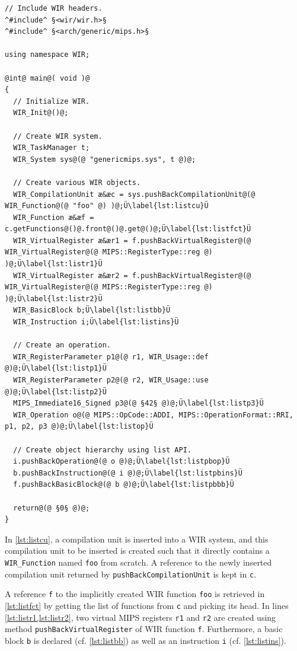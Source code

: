 \begin{lstlisting}[style=code,float=ht,caption={Construction of Object Hierarchies using List Interface},label=lst:listconstruction]
// Include WIR headers.
^#include^ §<wir/wir.h>§
^#include^ §<arch/generic/mips.h>§

using namespace WIR;

@int@ main@( void )@
{
  // Initialize WIR.
  WIR_Init@()@;

  // Create WIR system.
  WIR_TaskManager t;
  WIR_System sys@(@ "genericmips.sys", t @)@;

  // Create various WIR objects.
  WIR_CompilationUnit æ&æc = sys.pushBackCompilationUnit@(@ WIR_Function@(@ "foo" @) )@;Ü\label{lst:listcu}Ü
  WIR_Function æ&æf = c.getFunctions@()@.front@()@.get@()@;Ü\label{lst:listfct}Ü
  WIR_VirtualRegister æ&ær1 = f.pushBackVirtualRegister@(@ WIR_VirtualRegister@(@ MIPS::RegisterType::reg @) )@;Ü\label{lst:listr1}Ü
  WIR_VirtualRegister æ&ær2 = f.pushBackVirtualRegister@(@ WIR_VirtualRegister@(@ MIPS::RegisterType::reg @) )@;Ü\label{lst:listr2}Ü
  WIR_BasicBlock b;Ü\label{lst:listbb}Ü
  WIR_Instruction i;Ü\label{lst:listins}Ü

  // Create an operation.
  WIR_RegisterParameter p1@(@ r1, WIR_Usage::def @)@;Ü\label{lst:listp1}Ü
  WIR_RegisterParameter p2@(@ r2, WIR_Usage::use @)@;Ü\label{lst:listp2}Ü
  MIPS_Immediate16_Signed p3@(@ §42§ @)@;Ü\label{lst:listp3}Ü
  WIR_Operation o@(@ MIPS::OpCode::ADDI, MIPS::OperationFormat::RRI, p1, p2, p3 @)@;Ü\label{lst:listop}Ü

  // Create object hierarchy using list API.
  i.pushBackOperation@(@ o @)@;Ü\label{lst:listpbop}Ü
  b.pushBackInstruction@(@ i @)@;Ü\label{lst:listpbins}Ü
  f.pushBackBasicBlock@(@ b @)@;Ü\label{lst:listpbbb}Ü

  return@(@ §0§ @)@;
}
\end{lstlisting}

In \cref{lst:listcu}, a compilation unit is inserted into a \gls{WIR} system, and this compilation unit to be inserted is created such that it directly contains a \texttt{WIR\_Function} named \texttt{foo} from scratch.
A reference to the newly inserted compilation unit returned by \texttt{pushBackCompilationUnit} is kept in \texttt{c}.

A reference \texttt{f} to the implicitly created \gls{WIR} function \texttt{foo} is retrieved in \cref{lst:listfct} by getting the list of functions from \texttt{c} and picking its head.
In lines \cref{lst:listr1,lst:listr2}, two virtual MIPS registers \texttt{r1} and \texttt{r2} are created using method \texttt{pushBackVirtualRegister} of \gls{WIR} function \texttt{f}.
Furthermore, a basic block \texttt{b} is declared (cf. \cref{lst:listbb}) as well as an instruction \texttt{i} (cf. \cref{lst:listins}).

